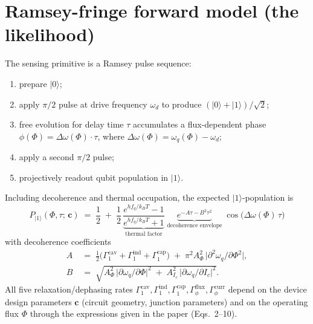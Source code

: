 \documentclass[11pt,a4paper]{article}
\begin{document}
\section{Ramsey-fringe forward model (the likelihood)}

The sensing primitive is a Ramsey pulse sequence:
\begin{enumerate}[nosep,leftmargin=2em]
  \item prepare $|0\rangle$;
  \item apply $\pi/2$ pulse at drive frequency $\omega_d$ to produce $(|0\rangle + |1\rangle)/\sqrt{2}$;
  \item free evolution for delay time $\tau$ accumulates a flux-dependent phase $\phi(\Phi) = \Delta\omega(\Phi)\cdot\tau$, where $\Delta\omega(\Phi) = \omega_q(\Phi) - \omega_d$;
  \item apply a second $\pi/2$ pulse;
  \item projectively readout qubit population in $|1\rangle$.
\end{enumerate}

Including decoherence and thermal occupation, the expected $|1\rangle$-population is
\begin{equation}
  \boxed{\;
  P_{|1\rangle}(\Phi,\tau;\,\bm{c}) \;=\; \frac{1}{2} \;+\; \frac{1}{2}\,\underbrace{\frac{e^{h f_q / k_B T}-1}{e^{h f_q / k_B T}+1}}_{\text{thermal factor}}\;\underbrace{e^{-A\tau - B^2\tau^2}}_{\text{decoherence envelope}}\;\cos\!\bigl(\Delta\omega(\Phi)\,\tau\bigr)\;}
  \label{eq:ramsey}
\end{equation}
with decoherence coefficients
\begin{align}
  A &\;=\; \tfrac{1}{2}\bigl(\Gamma_1^{\mathrm{cav}}+\Gamma_1^{\mathrm{ind}}+\Gamma_1^{\mathrm{cap}}\bigr) \;+\; \pi^2 A_\Phi^2\,\bigl|\partial^2\omega_q/\partial\Phi^2\bigr|,\\[2pt]
  B &\;=\; \sqrt{A_\Phi^2\,\bigl|\partial\omega_q/\partial\Phi\bigr|^2 \;+\; A_{I_c}^2\,\bigl|\partial\omega_q/\partial I_c\bigr|^2}.
  \label{eq:AB}
\end{align}
All five relaxation/dephasing rates $\Gamma_1^{\mathrm{cav}}, \Gamma_1^{\mathrm{ind}}, \Gamma_1^{\mathrm{cap}}, \Gamma_\phi^{\mathrm{flux}}, \Gamma_\phi^{\mathrm{curr}}$ depend on the device design parameters $\bm{c}$ (circuit geometry, junction parameters) and on the operating flux $\Phi$ through the expressions given in the paper (Eqs.~2--10).
\end{document}
